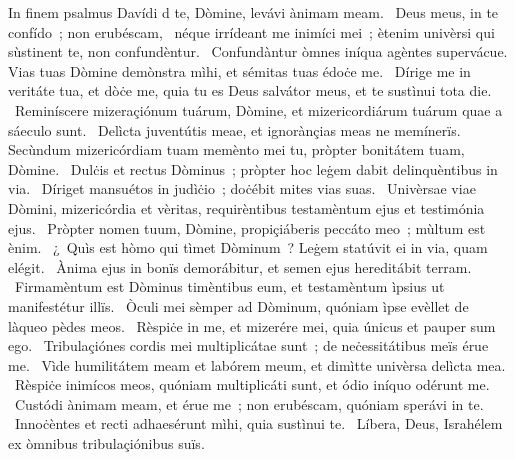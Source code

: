 { In finem psalmus Davídi}
{%
d te, Dòmine, levávi ànimam meam. 
~Deus meus, in te confído~; non erubéscam, 
~néque irrídeant me inimíci mei~; ètenim univèrsi qui sùstinent te, non confundèntur. 
~Confundàntur òmnes iníqua agèntes supervácue. Vias tuas Dòmine demònstra mìhi, et sémitas tuas édoċe me. 
~Dírige me in veritáte tua, et dòċe me, quia tu es Deus salvátor meus, et te sustìnui tota die. 
~Reminíscere mizeraçiónum tuárum, Dòmine, et mizericordiárum tuárum quae a sáeculo sunt. 
~Delìcta juventútis meae, et ignorànçias meas ne memínerïs. Secùndum mizericórdiam tuam memènto mei tu, pròpter bonitátem tuam, Dòmine. 
~Dulċis et rectus Dòminus~; pròpter hoc leġem dabit delinquèntibus in via. 
~Díriget mansuétos in judìċio~; doċébit mites vias suas. 
~Univèrsae viae Dòmini, mizericórdia et vèritas, requirèntibus testamèntum ejus et testimónia ejus. 
~Pròpter nomen tuum, Dòmine, propiçiáberis peccáto meo~; mùltum est ènim. 
~¿~Quìs est hòmo qui tìmet Dòminum~? Leġem statúvit ei in via, quam elégit. 
~Ànima ejus in bonïs demorábitur, et semen ejus hereditábit terram. 
~Firmamèntum est Dòminus timèntibus eum, et testamèntum ìpsius ut manifestétur illïs. 
~Òculi mei sèmper ad Dòminum, quóniam ìpse evèllet de làqueo pèdes meos. 
~Rèspiċe in me, et mizerére mei, quia únicus et pauper sum ego. 
~Tribulaçiónes cordis mei multiplicátae sunt~; de neċessitátibus meïs érue me. 
~Vìde humilitátem meam et labórem meum, et dimìtte univèrsa delìcta mea. 
~Rèspiċe inimícos meos, quóniam multiplicáti sunt, et ódio iníquo odérunt me. 
~Custódi ànimam meam, et érue me~; non erubéscam, quóniam sperávi in te. 
~Innoċèntes et recti adhaesérunt mìhi, quia sustìnui te. 
~Líbera, Deus, Israhélem ex òmnibus tribulaçiónibus suïs. 
}
